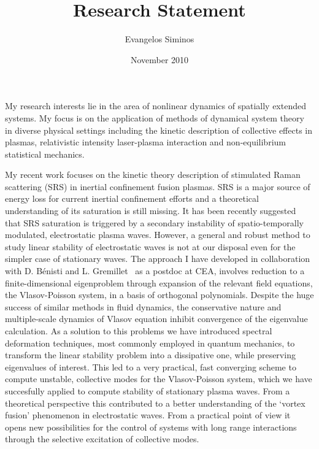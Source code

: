 \documentclass[a4paper,10pt]{article}
\title{Research Statement}
\author{Evangelos Siminos}
\date{November 2010}
\begin{document}
\maketitle

My research interests lie in the area of nonlinear dynamics of 
spatially extended systems. My focus is on the application of methods
of dynamical system theory in diverse physical settings including
the kinetic description of collective effects in plasmas, 
relativistic intensity laser-plasma interaction and non-equilibrium 
statistical mechanics. 


My recent work focuses on the kinetic theory description of stimulated Raman
scattering (SRS) in inertial confinement fusion plasmas.
SRS is a major source of energy loss for current inertial confinement efforts
and a theoretical understanding of its saturation is still missing.
It has been recently suggested that SRS saturation is triggered by a
secondary instability of spatio-temporally modulated, 
electrostatic plasma waves. However, a general and robust method 
to study linear stability of electrostatic waves is not at our disposal 
even for the simpler case of stationary waves. 
The approach I have developed in collaboration with D. B\'enisti and 
L. Gremillet~\cite{siminos11}
as a postdoc at CEA, involves reduction to a finite-dimensional eigenproblem
through expansion of the relevant field equations, the Vlasov-Poisson system, 
in a basis of orthogonal polynomials. Despite the huge success of similar
methods in fluid dynamics, the conservative nature and multiple-scale dynamics
of Vlasov equation inhibit convergence of the eigenvalue calculation. As
a solution to this problems we have introduced spectral deformation techniques,
most commonly employed in quantum mechanics, to transform the linear 
stability problem into a dissipative one, while preserving eigenvalues 
of interest. This led to a very practical, fast converging scheme 
to compute unstable, collective modes for the Vlasov-Poisson system, 
which we have succesfully applied to compute stability of stationary 
plasma waves. From a theoretical perspective
this contributed to a better understanding of the `vortex fusion'
phenomenon in electrostatic waves. From a practical point of view it opens 
new possibilities for the control of systems with long range interactions 
through the selective excitation of collective modes.
\end{document}
